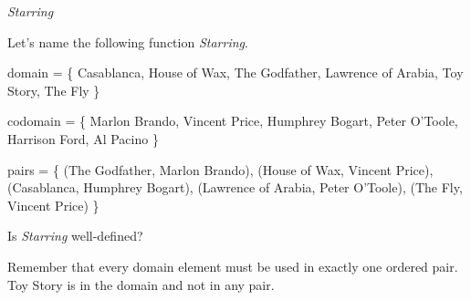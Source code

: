 \documentclass{ximera}
\begin{document}
\begin{example} \textit{Starring}

Let's name the following function \textit{Starring}.

domain = \{ Casablanca, House of Wax,  The Godfather, Lawrence of Arabia, Toy Story, The Fly \}

codomain = \{ Marlon Brando, Vincent Price, Humphrey Bogart, Peter O'Toole, Harrison Ford, Al Pacino \}

pairs = \{ (The Godfather, Marlon Brando), (House of Wax, Vincent Price), (Casablanca, Humphrey Bogart), (Lawrence of Arabia, Peter O'Toole), (The Fly, Vincent Price) \} 





\begin{question}

Is \textit{Starring} well-defined?

\begin{multipleChoice}
\end{multipleChoice}
\begin{feedback}
Remember that every domain element must be used in exactly one ordered pair. Toy Story is in the domain and not in any pair.
\end{feedback}

\end{question}



\end{example}
\end{document}
